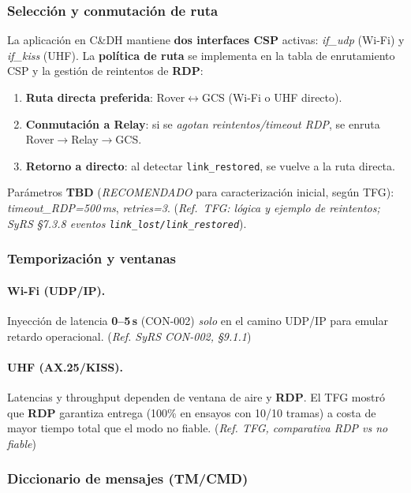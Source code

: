 \subsubsection{Selección y conmutación de ruta}
La aplicación en C\&DH mantiene \textbf{dos interfaces CSP} activas: \emph{if\_udp} (Wi-Fi) y \emph{if\_kiss} (UHF).
La \textbf{política de ruta} se implementa en la tabla de enrutamiento CSP y la gestión de reintentos de \textbf{RDP}:
\begin{enumerate}
  \item \textbf{Ruta directa preferida}: Rover$\leftrightarrow$GCS (Wi-Fi o UHF directo).
  \item \textbf{Conmutación a Relay}: si se \emph{agotan reintentos/\allowbreak timeout RDP},
        se enruta Rover$\rightarrow$Relay$\rightarrow$GCS.
  \item \textbf{Retorno a directo}: al detectar \texttt{link\_restored}, se vuelve a la ruta directa.
\end{enumerate}
\begin{sloppypar}
Parámetros \textbf{TBD} (\emph{RECOMENDADO} para caracterización inicial, según TFG):
\emph{timeout\_\allowbreak RDP=500\,ms}, \emph{retries=3}.
(\emph{Ref.\ TFG: lógica y ejemplo de reintentos; SyRS §7.3.8 eventos
\texttt{link\_lost/\allowbreak link\_restored}}).
\end{sloppypar}

\subsubsection{Temporización y ventanas}
\paragraph{Wi-Fi (UDP/IP).}
Inyección de latencia \textbf{0–5\,s} (CON-002) \emph{solo} en el camino UDP/IP para emular retardo operacional.
(\emph{Ref. SyRS CON-002, §9.1.1})%

\paragraph{UHF (AX.25/KISS).}
Latencias y throughput dependen de ventana de aire y \textbf{RDP}. El TFG mostró que \textbf{RDP} garantiza
entrega (100\% en ensayos con 10/10 tramas) a costa de mayor tiempo total que el modo no fiable.%
(\emph{Ref. TFG, comparativa RDP vs no fiable})%

\subsubsection{Diccionario de mensajes (TM/CMD)}
